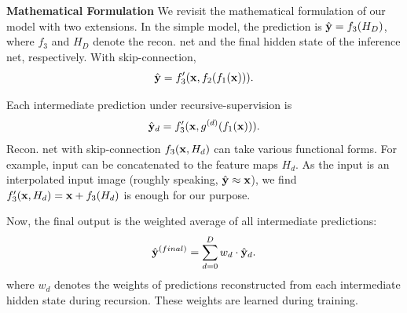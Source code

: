 \documentclass[10pt,twocolumn,letterpaper]{article}
\begin{document}
\textbf{Mathematical Formulation} We revisit the mathematical formulation of our model with two extensions. In the simple model, the prediction is $\hat{{\bf y}} = f_3(H_D)$, where $f_3$ and $H_D$ denote the recon. net and the final hidden state of the inference net, respectively. With skip-connection,  
\begin{equation}
\hat{{\bf y}} = f_3'({\bf x}, f_2(f_1({\bf x}))).
\end{equation}


Each intermediate prediction under recursive-supervision is 
\begin{equation}
\hat{{\bf y}}_{d} = f_3'({\bf x}, g^{(d)}(f_1({\bf x}))).
\end{equation}
Recon. net with skip-connection $f_3({\bf x}, H_d)$ can take various functional forms. For example, input can be concatenated to the feature maps $H_d$. As the input is an interpolated input image (roughly speaking, $\hat{\bf y} \approx {\bf x}$), we find $f_3'({\bf x}, H_d) = {\bf x} + f_3(H_d)$ is enough for our purpose. 


Now, the final output is the weighted average of all intermediate predictions:
\begin{equation}
\hat{{\bf y}}^{(final)} = \sum_{d=0}^{D} w_d \cdot \hat{{\bf y}}_d.
\end{equation}
where $w_d$ denotes the weights of predictions reconstructed from each intermediate hidden state during recursion. These weights are learned during training.
%
\end{document}
